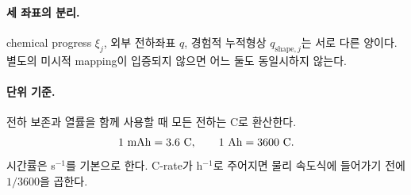 \paragraph{ 세 좌표의 분리.}
chemical progress $\xi_j$, 외부 전하좌표 $q$, 경험적 누적형상
$q_{\mathrm{shape},j}$는 서로 다른 양이다. 별도의 미시적 mapping이
입증되지 않으면 어느 둘도 동일시하지 않는다.

\paragraph{ 단위 기준.}
전하 보존과 열률을 함께 사용할 때 모든 전하는 C로 환산한다.
\[
1\ {\rm mAh}=3.6\ {\rm C},\qquad 1\ {\rm Ah}=3600\ {\rm C}.
\]
시간률은 s$^{-1}$를 기본으로 한다. C-rate가 h$^{-1}$로 주어지면
물리 속도식에 들어가기 전에 $1/3600$을 곱한다.
